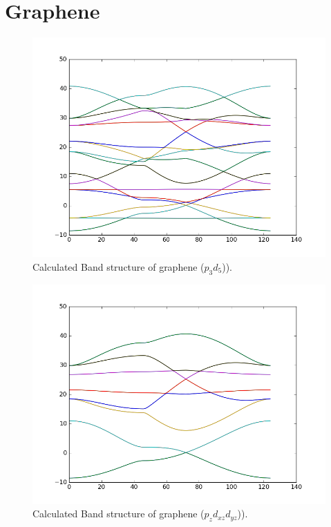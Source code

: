 \newpage
\section{Graphene}
\begin{figure}[h] 
\begin{center}
  \includegraphics[width=0.55\linewidth]{img/graphene_pd_soc}
  \caption{Calculated Band structure of graphene ($p_3d_5$)).}
\end{center}
\end{figure}
\begin{figure}[h] 
\begin{center}
  \includegraphics[width=0.55\linewidth]{img/graphene_pd_soc3}
  \caption{Calculated Band structure of graphene ($p_zd_{xz}d_{yz}$)).}
\end{center}
\end{figure}
